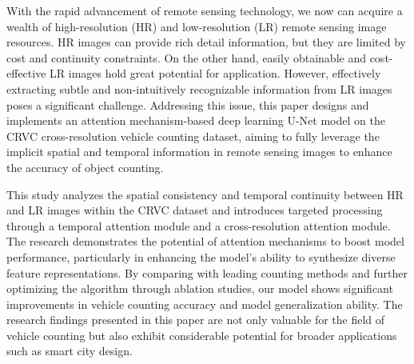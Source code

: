 
With the rapid advancement of remote sensing technology, we now can acquire a wealth of high-resolution (HR) and low-resolution (LR) remote sensing image resources. HR images can provide rich detail information, but they are limited by cost and continuity constraints. On the other hand, easily obtainable and cost-effective LR images hold great potential for application. However, effectively extracting subtle and non-intuitively recognizable information from LR images poses a significant challenge. Addressing this issue, this paper designs and implements an attention mechanism-based deep learning U-Net model on the CRVC cross-resolution vehicle counting dataset, aiming to fully leverage the implicit spatial and temporal information in remote sensing images to enhance the accuracy of object counting.

This study analyzes the spatial consistency and temporal continuity between HR and LR images within the CRVC dataset and introduces targeted processing through a temporal attention module and a cross-resolution attention module. The research demonstrates the potential of attention mechanisms to boost model performance, particularly in enhancing the model's ability to synthesize diverse feature representations. By comparing with leading counting methods and further optimizing the algorithm through ablation studies, our model shows significant improvements in vehicle counting accuracy and model generalization ability. The research findings presented in this paper are not only valuable for the field of vehicle counting but also exhibit considerable potential for broader applications such as smart city design. 